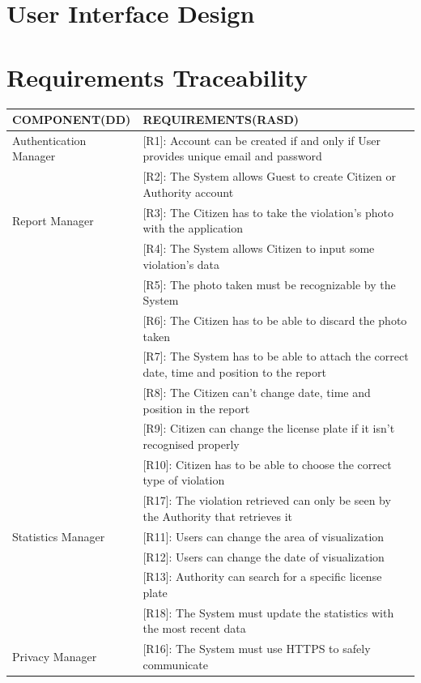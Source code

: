 \documentclass{article}
\begin{document}
\section{User Interface Design} 
\section{Requirements Traceability}
\begin{center}
    \begin{tabular}{ | l | l |}
        \hline
        COMPONENT(DD) & REQUIREMENTS(RASD) \\
        \hline
        Authentication Manager & [R1]: Account can be created if and only if User provides unique email and password \\
                               & [R2]: The System allows Guest to create Citizen or Authority account \\
        \hline
        Report Manager  & [R3]: The Citizen has to take the violation’s photo with the application \\
                        & [R4]: The System allows Citizen to input some violation’s data \\
                        & [R5]: The photo taken must be recognizable by the System \\
                        & [R6]: The Citizen has to be able to discard the photo taken \\
                        & [R7]: The System has to be able to attach the correct date, time and position to the report \\
                        & [R8]: The Citizen can’t change date, time and position in the report \\ 
                        & [R9]: Citizen can change the license plate if it isn’t recognised properly \\
                        & [R10]: Citizen has to be able to choose the correct type of violation \\
                        & [R17]: The violation retrieved can only be seen by the Authority that retrieves it \\
        \hline
        Statistics Manager & [R11]: Users can change the area of visualization \\
                           & [R12]: Users can change the date of visualization \\
                           & [R13]: Authority can search for a specific license plate \\
                           & [R18]: The System must update the statistics with the most recent data \\
        \hline
        Privacy Manager & [R16]: The System must use HTTPS to safely communicate \\


\end{tabular}
\end{center}
\end{document}

